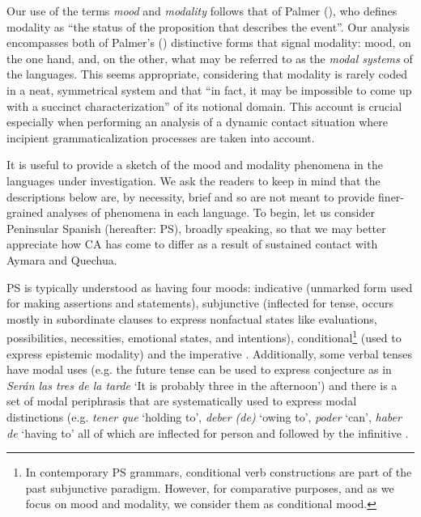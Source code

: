 \documentclass[output=paper,hidelinks]{langscibook}
\begin{document}
Our use of the terms \textit{mood} and \textit{modality} follows that of Palmer (\citeyear[1]{RN26}), who defines modality as ``the status of the proposition that describes the event''. Our analysis encompasses both of Palmer’s (\citeyear{RN26}) distinctive forms that signal modality: mood, on the one hand, and, on the other, what may be referred to as the \textit{modal systems} of the languages. This seems appropriate, considering that modality is rarely coded in a neat, symmetrical system and that “in fact, it may be impossible to come up with a succinct characterization'' \citep[176]{RN25} of its notional domain. This account is crucial especially when performing an analysis of a dynamic contact situation where incipient grammaticalization processes are taken into account.

It is useful to provide a sketch of the mood and modality phenomena in the languages under investigation. We ask the readers to keep in mind that the descriptions below are, by necessity, brief and so are not meant to provide finer-grained analyses of phenomena in each language. To begin, let us consider Peninsular Spanish (hereafter: PS), broadly speaking, so that we may better appreciate how CA has come to differ as a result of sustained contact with Aymara and Quechua.

PS is typically understood as having four moods: indicative (unmarked form used for making assertions and statements), subjunctive (inflected for tense, occurs mostly in subordinate clauses to express nonfactual states like evaluations, possibilities, necessities, emotional states, and intentions), conditional\footnote{In contemporary PS grammars, conditional verb constructions are part of the past subjunctive paradigm. However, for comparative purposes, and as we focus on mood and modality, we consider them as conditional mood.} (used to express epistemic modality) and the imperative \citep{RN24}. Additionally, some verbal tenses have modal uses (e.g. the future tense can be used to express conjecture as in \textit{Serán las tres de la tarde} ‘It is probably three in the afternoon’) and there is a set of modal periphrasis that are systematically used to express modal distinctions (e.g. \textit{tener que} `holding to’, \textit{deber (de)} `owing to’, \textit{poder} ‘can’, \textit{haber de} ‘having to’ all of which are inflected for person and followed by the infinitive \citep[ch. 25, ch. 28.6]{RN56}.

\end{document}
